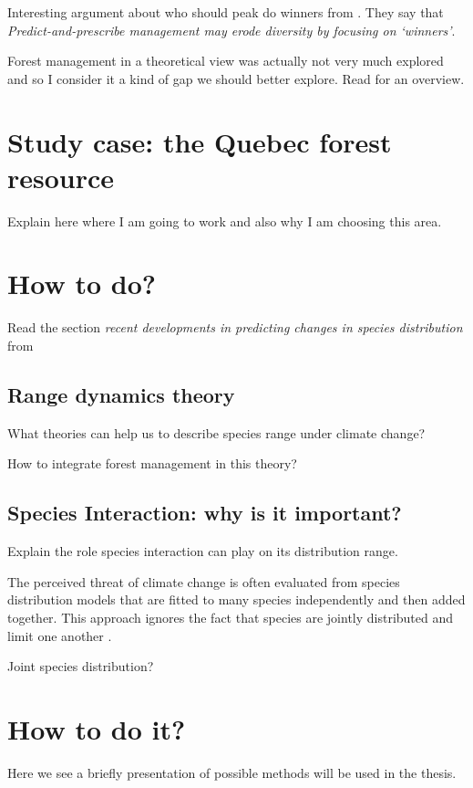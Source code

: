 \documentclass[a4paper,12pt,twoside]{article}
\begin{document}
Interesting argument about who should peak do winners from \cite{Webster2017}. They say that \textit{Predict-and-prescribe management may erode diversity by focusing on ‘winners’}.

Forest management in a theoretical view was actually not very much explored and so I consider it a kind of gap we should better explore. Read \cite{Becknell2015a} for an overview.

\section{Study case: the Quebec forest resource}

Explain here where I am going to work and also why I am choosing this area.

\section{How to do?}

Read the section \textit{recent developments in predicting changes in species distribution} from \cite{Ehrlen2015c}

\subsection*{Range dynamics theory}

What theories can help us to describe species range under climate change?

How to integrate forest management in this theory?

\subsection*{Species Interaction: why is it important?}
Explain the role species interaction can play on its distribution range.

The perceived threat of climate change is often evaluated from species distribution models that are fitted to many species independently and then added together. This approach ignores the fact that species are jointly distributed and limit one another \citep{clark2014}.

Joint species distribution?

\section{How to do it?}

Here we see a briefly presentation of possible methods will be used in the thesis.
\end{document}
